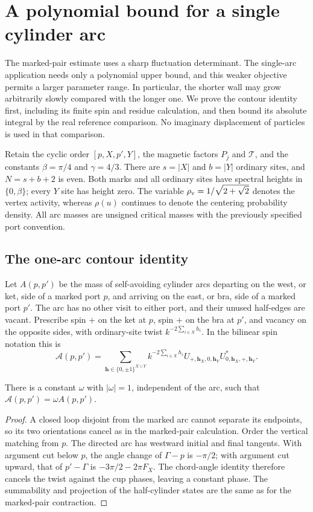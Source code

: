 \section{A polynomial bound for a single cylinder arc}
\label{sec:one-arc}

The marked-pair estimate uses a sharp fluctuation determinant.  The
single-arc application needs only a polynomial upper bound, and this
weaker objective permits a larger parameter range.  In particular,
the shorter wall may grow arbitrarily slowly compared with the longer
one.  We prove the contour identity first, including its finite spin
and residue calculation, and then bound its absolute integral by the
real reference comparison.  No imaginary displacement of particles is
used in that comparison.

Retain the cyclic order $[p,X,p',Y]$, the magnetic factors $P_j$ and
$\mathcal T$, and the constants $\beta=\pi/4$ and $\gamma=4/3$.
There are $s=|X|$ and $b=|Y|$ ordinary sites, and $N=s+b+2$ is even.
Both marks and all ordinary sites have spectral heights in
$\{0,\beta\}$; every $Y$ site has height zero.  The variable
$\rho_{\rm v}=1/\sqrt{2+\sqrt2}$ denotes the vertex activity,
whereas $\rho(u)$ continues to denote the centering probability
density.  All arc masses are unsigned critical masses with the
previously specified port convention.

\subsection{The one-arc contour identity}

Let \(A(p,p')\) be the mass of self-avoiding cylinder arcs departing
on the west, or ket, side of a marked port \(p\), and arriving on the
east, or bra, side of a marked port \(p'\).  The arc has no other visit
to either port, and their unused half-edges are vacant.  Prescribe spin
\(+\) on the ket at \(p\), spin \(+\) on the bra at \(p'\), and
vacancy on the opposite sides, with ordinary-site twist
\(k^{-2\sum_{i\in X}h_i}\).  In the bilinear spin notation this is
\[
 \mathcal A(p,p')=
 \sum_{\mathbf h\in\{0,\pm1\}^{X\cup Y}}
 k^{-2\sum_{i\in X}h_i}
 U_{+,\mathbf h_X,0,\mathbf h_Y}
 U^*_{0,\mathbf h_X,+,\mathbf h_Y}.
\]

\begin{lemma}\label{09_fast_paths:one-arc-contraction}
There is a constant $\omega$ with $|\omega|=1$, independent of the
arc, such that $\mathcal A(p,p')=\omega A(p,p')$.
\end{lemma}
\begin{proof}
A closed loop disjoint from the marked arc cannot separate its endpoints,
so its two orientations cancel as in the marked-pair calculation.  Order
the vertical matching from \(p\).  The directed arc has westward initial
and final tangents.  With argument cut below \(p\), the angle change of
\(\Gamma-p\) is \(-\pi/2\); with argument cut upward, that of
\(p'-\Gamma\) is \(-3\pi/2-2\pi F_X\).  The chord-angle identity
therefore cancels the twist against the cup phases, leaving a constant
phase.  The summability and projection of the half-cylinder states are
the same as for the marked-pair contraction.
\end{proof}

